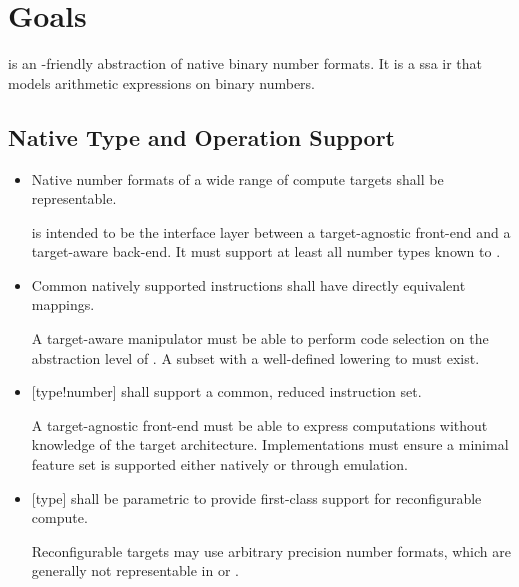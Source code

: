 \section{Goals}

\basetwo is an \MLIR-friendly abstraction of native binary number formats.
It is a \gls{ssa} \gls{ir} that models arithmetic expressions on binary numbers.

\subsection{Native Type and Operation Support}

\begin{itemize}
    \item[\Goal{goal:native_type}] Native number formats of a wide range of compute targets shall be representable.

    \begin{highlight}{}
        \basetwo is intended to be the interface layer between a target-agnostic front-end and a target-aware back-end.
        It must support at least all number types known to \LLVMIR.
    \end{highlight}

    \item[\Goal{goal:native_ops}] Common natively supported instructions shall have directly equivalent mappings.

    \begin{highlight}{}
        A target-aware manipulator must be able to perform code selection on the abstraction level of \basetwo.
        A subset with a well-defined lowering to \LLVMIR must exist.
    \end{highlight}

    \item[\Goal{goal:reduced}] [type!number] shall support a common, reduced instruction set.

    \begin{highlight}{}
        A target-agnostic front-end must be able to express computations without knowledge of the target architecture.
        Implementations must ensure a minimal feature set is supported either natively or through emulation.
    \end{highlight}

    \item[\Goal{goal:param_types}] [type] shall be parametric to provide first-class support for reconfigurable compute.

    \begin{highlight}{}
        Reconfigurable targets may use arbitrary precision number formats, which are generally not representable in \LLVMIR or \arith.
    \end{highlight}
\end{itemize}

